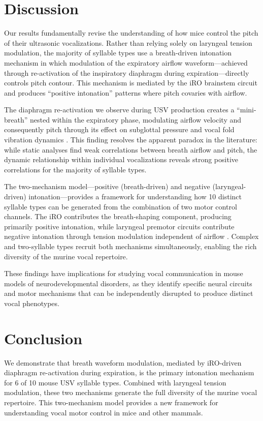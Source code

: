 \documentclass[11pt]{article}
\begin{document}
\section{Discussion}

Our results fundamentally revise the understanding of how mice control the pitch of their ultrasonic vocalizations. Rather than relying solely on laryngeal tension modulation, the majority of syllable types use a breath-driven intonation mechanism in which modulation of the expiratory airflow waveform---achieved through re-activation of the inspiratory diaphragm during expiration---directly controls pitch contour. This mechanism is mediated by the iRO brainstem circuit and produces ``positive intonation'' patterns where pitch covaries with airflow.

The diaphragm re-activation we observe during USV production creates a ``mini-breath'' nested within the expiratory phase, modulating airflow velocity and consequently pitch through its effect on subglottal pressure and vocal fold vibration dynamics \citep{titze1988regulation, alipour2002pressure}. This finding resolves the apparent paradox in the literature: while static analyses find weak correlations between breath airflow and pitch, the dynamic relationship within individual vocalizations reveals strong positive correlations for the majority of syllable types.

The two-mechanism model---positive (breath-driven) and negative (laryngeal-driven) intonation---provides a framework for understanding how 10 distinct syllable types can be generated from the combination of two motor control channels. The iRO contributes the breath-shaping component, producing primarily positive intonation, while laryngeal premotor circuits contribute negative intonation through tension modulation independent of airflow \citep{tschida2019vocal, hage2009audio}. Complex and two-syllable types recruit both mechanisms simultaneously, enabling the rich diversity of the murine vocal repertoire.

These findings have implications for studying vocal communication in mouse models of neurodevelopmental disorders, as they identify specific neural circuits and motor mechanisms that can be independently disrupted to produce distinct vocal phenotypes.

\section{Conclusion}

We demonstrate that breath waveform modulation, mediated by iRO-driven diaphragm re-activation during expiration, is the primary intonation mechanism for 6 of 10 mouse USV syllable types. Combined with laryngeal tension modulation, these two mechanisms generate the full diversity of the murine vocal repertoire. This two-mechanism model provides a new framework for understanding vocal motor control in mice and other mammals.



\end{document}
